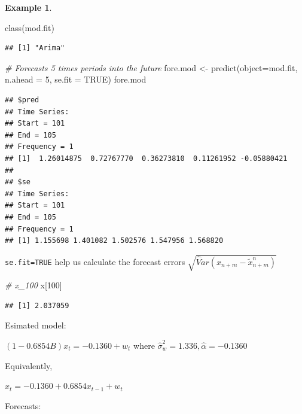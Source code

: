 \documentclass[
]{book}
\newenvironment{Shaded}{\begin{snugshade}}{\end{snugshade}}
\newcommand{\AttributeTok}[1]{\textcolor[rgb]{0.77,0.63,0.00}{#1}}
\newcommand{\CommentTok}[1]{\textcolor[rgb]{0.56,0.35,0.01}{\textit{#1}}}
\newcommand{\ConstantTok}[1]{\textcolor[rgb]{0.00,0.00,0.00}{#1}}
\newcommand{\DecValTok}[1]{\textcolor[rgb]{0.00,0.00,0.81}{#1}}
\newcommand{\FunctionTok}[1]{\textcolor[rgb]{0.00,0.00,0.00}{#1}}
\newcommand{\NormalTok}[1]{#1}
\newcommand{\OtherTok}[1]{\textcolor[rgb]{0.56,0.35,0.01}{#1}}
\theoremstyle{definition}
\theoremstyle{definition}
\newtheorem{example}{Example}[chapter]
\theoremstyle{definition}
\theoremstyle{definition}
\theoremstyle{remark}
\begin{document}
\begin{example}
\begin{Shaded}
\begin{Highlighting}[]
\FunctionTok{class}\NormalTok{(mod.fit)}
\end{Highlighting}
\end{Shaded}

\begin{verbatim}
## [1] "Arima"
\end{verbatim}

\begin{Shaded}
\begin{Highlighting}[]
\CommentTok{\# Forecasts 5 times periods into the future}
\NormalTok{fore.mod }\OtherTok{\textless{}{-}} \FunctionTok{predict}\NormalTok{(}\AttributeTok{object=}\NormalTok{mod.fit, }\AttributeTok{n.ahead =} \DecValTok{5}\NormalTok{, }\AttributeTok{se.fit =} \ConstantTok{TRUE}\NormalTok{)}
\NormalTok{fore.mod}
\end{Highlighting}
\end{Shaded}

\begin{verbatim}
## $pred
## Time Series:
## Start = 101 
## End = 105 
## Frequency = 1 
## [1]  1.26014875  0.72767770  0.36273810  0.11261952 -0.05880421
## 
## $se
## Time Series:
## Start = 101 
## End = 105 
## Frequency = 1 
## [1] 1.155698 1.401082 1.502576 1.547956 1.568820
\end{verbatim}

\texttt{se.fit=TRUE} help us calculate the forecast errors \(\sqrt{\hat Var(x_{n+m}-\tilde x^n_{n+m})}\)

\begin{Shaded}
\begin{Highlighting}[]
\CommentTok{\# x\_100}
\NormalTok{x[}\DecValTok{100}\NormalTok{]}
\end{Highlighting}
\end{Shaded}

\begin{verbatim}
## [1] 2.037059
\end{verbatim}

Esimated model:

\((1-0.6854B)x_t=-0.1360+w_t\) where \(\hat \sigma_w^2=1.336, \hat \alpha=-0.1360\)

Equivalently,

\(x_t=-0.1360+0.6854x_{t-1}+w_t\)

Forecasts:


\end{example}
\end{document}
